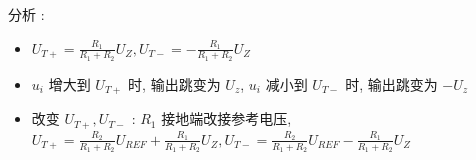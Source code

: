 \documentclass[UTF8, 12pt]{ctexart}
\begin{document}
	分析 :
	\begin{itemize}[leftmargin = 4em]
		\item $ U_{T+} = \frac{R_{1}}{R_{1}+R_{2}}U_{Z}, U_{T-} = -\frac{R_{1}}{R_{1}+R_{2}}U_{Z} $
		\item $ u_{i} $ 增大到 $ U_{T+} $ 时, 输出跳变为 $ U_{z} $, $ u_{i} $ 减小到 $ U_{T-} $ 时, 输出跳变为 $ -U_{z} $
		\item 改变 $ U_{T+}, U_{T-} $ : $ R_{1} $ 接地端改接参考电压, $ U_{T+} = \frac{R_{2}}{R_{1}+R_{2}}U_{REF} + \frac{R_{1}}{R_{1}+R_{2}}U_{Z}, U_{T-} = \frac{R_{2}}{R_{1}+R_{2}}U_{REF}-\frac{R_{1}}{R_{1}+R_{2}}U_{Z} $
	\end{itemize}
\end{document}

